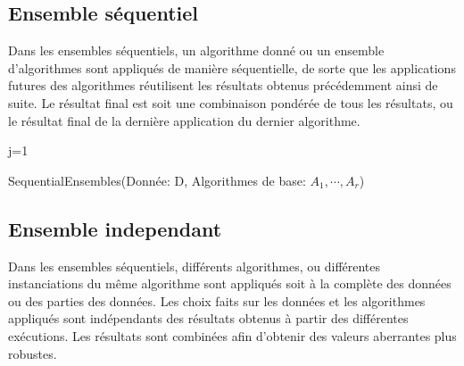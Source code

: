 \subsection*{Ensemble séquentiel }
Dans les ensembles séquentiels, un algorithme donné ou un ensemble d'algorithmes sont
appliqués de manière séquentielle, de sorte que les applications futures des algorithmes
réutilisent les résultats obtenus précédemment ainsi de suite. Le résultat final est soit une combinaison pondérée de tous les résultats, ou le résultat final de la dernière application du dernier algorithme. 

\begin{algorithm}
\SetAlgoLined
j=1\;
\caption{SequentialEnsembles(Donnée: D,
	Algorithmes de base: $A_1,\cdots,A_r$)}
\end{algorithm}%
\subsection*{Ensemble independant}
Dans les ensembles séquentiels, différents algorithmes, ou différentes instanciations
du même algorithme sont appliqués soit à la complète
des données ou des parties des données. Les choix faits sur les données
et les algorithmes appliqués sont indépendants des résultats obtenus
à partir des différentes exécutions. Les résultats sont combinées afin d'obtenir des valeurs aberrantes plus robustes.

